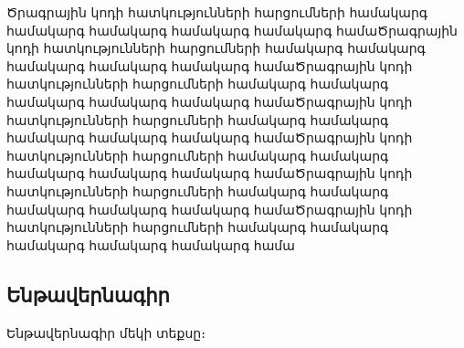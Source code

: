 {
	Ծրագրային կոդի հատկությունների հարցումների համակարգ համակարգ համակարգ համակարգ համակարգ համաԾրագրային կոդի հատկությունների հարցումների համակարգ համակարգ համակարգ համակարգ համակարգ համաԾրագրային կոդի հատկությունների հարցումների համակարգ համակարգ համակարգ համակարգ համակարգ համաԾրագրային կոդի հատկությունների հարցումների համակարգ համակարգ համակարգ համակարգ համակարգ համաԾրագրային կոդի հատկությունների հարցումների համակարգ համակարգ համակարգ համակարգ համակարգ համաԾրագրային կոդի հատկությունների հարցումների համակարգ համակարգ համակարգ համակարգ համակարգ համաԾրագրային կոդի հատկությունների հարցումների համակարգ համակարգ համակարգ համակարգ համակարգ համա

	\subsection{\textbf{Ենթավերնագիր}}

	Ենթավերնագիր մեկի տեքսը\cite{example-article}։
}
